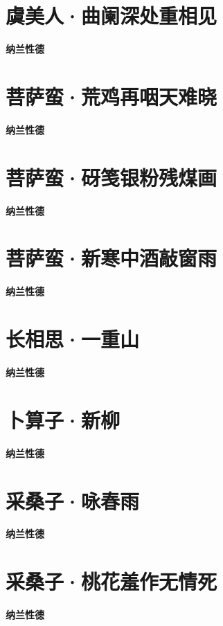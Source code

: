 \documentclass[12pt,a4paper]{ctexbook}
\begin{document}
\section{虞美人·曲阑深处重相见}
\textbf{纳兰性德}\par\vspace{0.5em}

\section{菩萨蛮·荒鸡再咽天难晓}
\textbf{纳兰性德}\par\vspace{0.5em}

\section{菩萨蛮·砑笺银粉残煤画}
\textbf{纳兰性德}\par\vspace{0.5em}

\section{菩萨蛮·新寒中酒敲窗雨}
\textbf{纳兰性德}\par\vspace{0.5em}

\section{长相思·一重山}
\textbf{纳兰性德}\par\vspace{0.5em}

\section{卜算子·新柳}
\textbf{纳兰性德}\par\vspace{0.5em}

\section{采桑子·咏春雨}
\textbf{纳兰性德}\par\vspace{0.5em}

\section{采桑子·桃花羞作无情死}
\textbf{纳兰性德}\par\vspace{0.5em}
\end{document}
